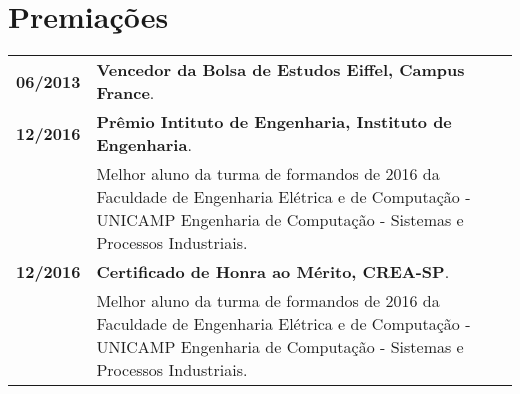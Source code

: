 \documentclass[10pt, a4paper]{article}
\begin{document}
\section{Premiações}

\begin{tabular}{p{} p{}}

\textbf{06/2013}  & \textbf{Vencedor da Bolsa de Estudos Eiffel, Campus
France}. \vspace{4pt} \\

\textbf{12/2016}  & \textbf{Prêmio Intituto de Engenharia, Instituto de Engenharia}.\\
& Melhor aluno da turma de formandos de 2016 da Faculdade de Engenharia Elétrica
e de Computação - UNICAMP Engenharia de Computação - Sistemas e Processos Industriais. \vspace{4pt}\\

\textbf{12/2016}  & \textbf{Certificado de Honra ao Mérito, CREA-SP}. \\
& Melhor aluno da turma de formandos de 2016 da Faculdade de Engenharia Elétrica
e de Computação - UNICAMP Engenharia de Computação - Sistemas e Processos Industriais. \vspace{4pt}\\

\end{tabular}

% 
% 
% 

\end{document}
